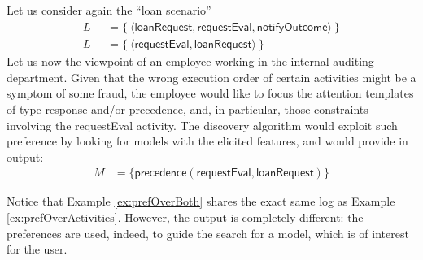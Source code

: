 \begin{example}
\label{ex:prefOverBoth}
Let us consider again the ``loan scenario'' %
%
\begin{align*}
L^+ & = \{\ \langle \mathsf{loanRequest}, \mathsf{requestEval}, \mathsf{notifyOutcome} \rangle \ \} \\
L^- & = \{\ \langle \mathsf{requestEval}, \mathsf{loanRequest} \rangle \ \}
\end{align*}
%
Let us  %
now the viewpoint of an employee working in the internal auditing department. Given that the wrong execution order of certain activities might be a symptom of some fraud, the employee would like to focus the attention  %
templates of type \textsf{response} and/or \textsf{precedence}, and, in particular,  %
those constraints involving the \textsf{requestEval} activity. The discovery algorithm would exploit such preference by looking for models with the elicited features, and would provide in output:
%
\begin{align*}
M & = \{ \mathsf{precedence(requestEval,loanRequest)}\}
\tag*{$\square$}
\end{align*}
\end{example}

Notice that Example \ref{ex:prefOverBoth} shares the exact same log as Example \ref{ex:prefOverActivities}. However, the output is completely different: the preferences are used, indeed, to guide the search for a model, which is of interest for the user.